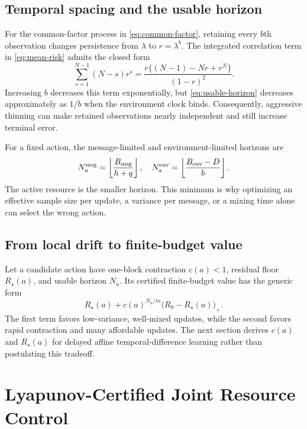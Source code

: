 \documentclass[journal]{IEEEtran}
\begin{document}
\subsection{Temporal spacing and the usable horizon}
For the common-factor process in \eqref{eq:common-factor}, retaining every $b$th observation changes persistence from $\lambda$ to $r=\lambda^b$.
The integrated correlation term in \eqref{eq:mean-risk} admits the closed form
\begin{equation}
\sum_{s=1}^{N-1}(N-s)r^s
=\frac{r\{(N-1)-Nr+r^N\}}{(1-r)^2}.
\label{eq:geometric-correlation-sum}
\end{equation}
Increasing $b$ decreases this term exponentially, but \eqref{eq:usable-horizon} decreases approximately as $1/b$ when the environment clock binds.
Consequently, aggressive thinning can make retained observations nearly independent and still increase terminal error.

For a fixed action, the message-limited and environment-limited horizons are
\begin{equation}
N^{\rm msg}_a=\left\lfloor\frac{B_{\rm msg}}{h+q}\right\rfloor,
\quad
N^{\rm env}_a=\left\lfloor\frac{B_{\rm env}-D}{b}\right\rfloor.
\label{eq:two-horizons}
\end{equation}
The active resource is the smaller horizon.
This minimum is why optimizing an effective sample size per update, a variance per message, or a mixing time alone can select the wrong action.

\subsection{From local drift to finite-budget value}
Let a candidate action have one-block contraction $c(a)<1$, residual floor $R_\star(a)$, and usable horizon $N_a$.
Its certified finite-budget value has the generic form
\begin{equation}
R_\star(a)+c(a)^{N_a/m}\bigl(R_0-R_\star(a)\bigr)_+.
\label{eq:generic-finite-budget-value}
\end{equation}
The first term favors low-variance, well-mixed updates, while the second favors rapid contraction and many affordable updates.
The next section derives $c(a)$ and $R_\star(a)$ for delayed affine temporal-difference learning rather than postulating this tradeoff.

\section{Lyapunov-Certified Joint Resource Control}
\end{document}

